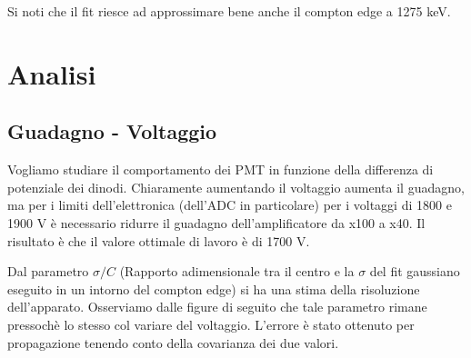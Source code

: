 \documentclass[a4paper,11pt,italian]{report}
\begin{document}
Si noti che il fit riesce ad approssimare bene anche il compton edge a 1275 keV.
\section*{Analisi}

\subsection*{Guadagno - Voltaggio}

Vogliamo studiare il comportamento dei PMT in funzione della differenza di potenziale dei dinodi. Chiaramente aumentando il voltaggio aumenta il guadagno, ma per i limiti dell'elettronica (dell'ADC in particolare) per i voltaggi di 1800 e 1900 V è necessario ridurre il guadagno dell'amplificatore da x100 a x40. Il risultato è che il valore ottimale di lavoro è di 1700 V. 

Dal parametro $\sigma/C$ (Rapporto adimensionale tra il centro e la $\sigma$ del fit gaussiano eseguito in un intorno del compton edge) si ha una stima della risoluzione dell'apparato. Osserviamo dalle figure di seguito che tale parametro rimane pressochè lo stesso col variare del voltaggio.
L'errore è stato ottenuto per propagazione tenendo conto della covarianza dei due valori.
\end{document}
